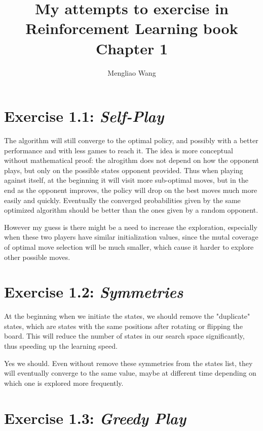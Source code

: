 \documentclass[12pt,letterpaper]{article}
\title{My attempts to exercise in Reinforcement Learning book Chapter 1}
\author{Mengliao Wang}
\begin{document}
\maketitle

\thispagestyle{empty}
\clearpage


\section*{Exercise 1.1: \textit{Self-Play} }
\label{1.1}

The algorithm will still converge to the optimal policy, and possibly with a better performance and with less games to reach it. The idea is more conceptual without mathematical proof: the alrogithm does not depend on how the opponent plays, but only on the possible states opponent provided. Thus when playing against itself, at the beginning it will visit more sub-optimal moves, but in the end as the opponent improves, the policy will drop on the best moves much more easily and quickly. Eventually the converged probabilities given by the same optimized algorithm should be better than the ones given by a random opponent.

However my guess is there might be a need to increase the exploration, especially when these two players have similar initialization values, since the mutal coverage of optimal move selection will be much smaller, which cause it harder to explore other possible moves.

\section*{Exercise 1.2: \textit{Symmetries} }
\label{1.2}

At the beginning when we initiate the states, we should remove the "duplicate" states, which are states with the same positions after rotating or flipping the board. This will reduce the number of states in our search space significantly, thus speeding up the learning speed.

Yes we should. Even without remove these symmetries from the states list, they will eventually converge to the same value, maybe at different time depending on which one is explored more frequently.

\section*{Exercise 1.3: \textit{Greedy Play} }
\label{1.3}
\end{document}

